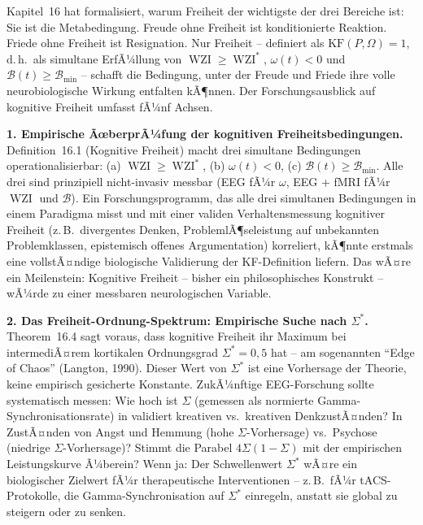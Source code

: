 ﻿\documentclass[12pt,a4paper]{report}
\theoremstyle{plain}
\theoremstyle{definition}
\theoremstyle{remark}
\DeclareMathOperator{\WZI}{WZI}
\begin{document}
	Kapitel~16 hat formalisiert, warum Freiheit der wichtigste
	der drei Bereiche ist: Sie ist die Metabedingung.
	Freude ohne Freiheit ist konditionierte Reaktion.
	Friede ohne Freiheit ist Resignation.
	Nur Freiheit -- definiert als $\mathrm{KF}(P,\Omega) = 1$,
	d.\,h.\ als simultane ErfÃ¼llung von $\WZI \geq \WZI^*$,
	$\omega(t) < 0$ und $\mathcal{B}(t) \geq \mathcal{B}_{\min}$ --
	schafft die Bedingung, unter der Freude und Friede ihre volle
	neurobiologische Wirkung entfalten kÃ¶nnen.
	Der Forschungsausblick auf kognitive Freiheit umfasst fÃ¼nf Achsen.

	\textbf{1. Empirische ÃœberprÃ¼fung der kognitiven Freiheitsbedingungen.}
	Definition~16.1 (Kognitive Freiheit) macht drei simultane Bedingungen
	operationalisierbar: (a) $\WZI \geq \WZI^*$, (b) $\omega(t) < 0$,
	(c) $\mathcal{B}(t) \geq \mathcal{B}_{\min}$.
	Alle drei sind prinzipiell nicht-invasiv messbar (EEG fÃ¼r $\omega$,
	EEG + fMRI fÃ¼r $\WZI$ und $\mathcal{B}$).
	Ein Forschungsprogramm, das alle drei simultanen Bedingungen in
	einem Paradigma misst und mit einer validen Verhaltensmessung
	kognitiver Freiheit (z.\,B.\ divergentes Denken, ProblemlÃ¶seleistung
	auf unbekannten Problemklassen, epistemisch offenes Argumentation)
	korreliert, kÃ¶nnte erstmals eine vollstÃ¤ndige biologische
	Validierung der KF-Definition liefern.
	Das wÃ¤re ein Meilenstein: Kognitive Freiheit -- bisher ein
	philosophisches Konstrukt -- wÃ¼rde zu einer messbaren
	neurologischen Variable.

	\textbf{2. Das Freiheit-Ordnung-Spektrum: Empirische Suche nach $\Sigma^*$.}
	Theorem~16.4 sagt voraus, dass kognitive Freiheit ihr Maximum bei
	intermediÃ¤rem kortikalen Ordnungsgrad $\Sigma^* = 0{,}5$ hat --
	am sogenannten ``Edge of Chaos'' (Langton, 1990).
	Dieser Wert von $\Sigma^*$ ist eine Vorhersage der Theorie,
	keine empirisch gesicherte Konstante.
	ZukÃ¼nftige EEG-Forschung sollte systematisch messen:
	Wie hoch ist $\Sigma$ (gemessen als normierte Gamma-Synchronisationsrate)
	in validiert kreativen vs.\ kreativen DenkzustÃ¤nden?
	In ZustÃ¤nden von Angst und Hemmung (hohe $\Sigma$-Vorhersage)
	vs.\ Psychose (niedrige $\Sigma$-Vorhersage)?
	Stimmt die Parabel $4\Sigma(1-\Sigma)$ mit der empirischen
	Leistungskurve Ã¼berein?
	Wenn ja: Der Schwellenwert $\Sigma^*$ wÃ¤re ein biologischer
	Zielwert fÃ¼r therapeutische Interventionen -- z.\,B.\ fÃ¼r
	tACS-Protokolle, die Gamma-Synchronisation auf $\Sigma^*$
	einregeln, anstatt sie global zu steigern oder zu senken.
\end{document}
